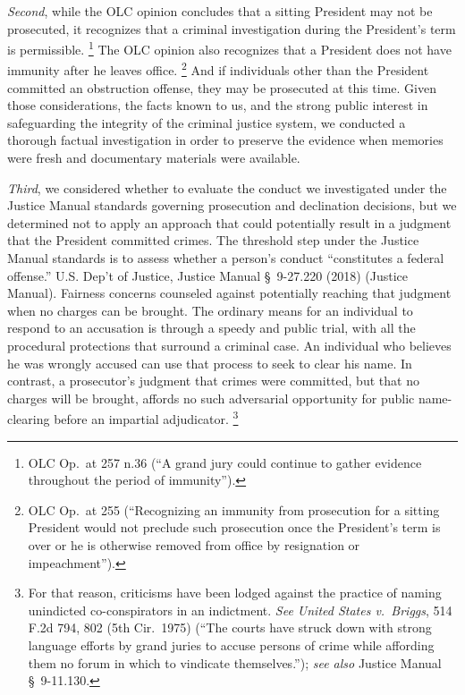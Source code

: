 \textit{Second}, while the OLC opinion concludes that a sitting President may not be prosecuted, it recognizes that a criminal investigation during the President’s term is permissible.%
\footnote{OLC Op.\ at 257 n.36 (“A grand jury could continue to gather evidence throughout the period of immunity”).}
The OLC opinion also recognizes that a President does not have immunity after he leaves office.%
\footnote{OLC Op.\ at 255 (“Recognizing an immunity from prosecution for a sitting President would not preclude such prosecution once the President’s term is over or he is otherwise removed from office by resignation or impeachment”).}
And if individuals other than the President committed an obstruction offense, they may be prosecuted at this time.
Given those considerations, the facts known to us, and the strong public interest in safeguarding the integrity of the criminal justice system, we conducted a thorough factual investigation in order to preserve the evidence when memories were fresh and documentary materials were available.

\textit{Third}, we considered whether to evaluate the conduct we investigated under the Justice Manual standards governing prosecution and declination decisions, but we determined not to apply an approach that could potentially result in a judgment that the President committed crimes.
The threshold step under the Justice Manual standards is to assess whether a person’s conduct
“constitutes a federal offense.”
U.S. Dep’t of Justice, Justice Manual \S~9-27.220 (2018) (Justice Manual).
Fairness concerns counseled against potentially reaching that judgment when no charges can be brought.
The ordinary means for an individual to respond to an accusation is through a speedy and public trial, with all the procedural protections that surround a criminal case.
An individual who believes he was wrongly accused can use that process to seek to clear his name.
In contrast, a prosecutor’s judgment that crimes were committed, but that no charges will be brought, affords no such adversarial opportunity for public name-clearing before an impartial adjudicator.%
\footnote{For that reason, criticisms have been lodged against the practice of naming unindicted co-conspirators in an indictment.
\textit{See United States v.\ Briggs}, 514 F.2d 794, 802 (5th Cir.~1975) (“The courts have struck down with strong language efforts by grand juries to accuse persons of crime while affording them no forum in which to vindicate themselves.”);
\textit{see also} Justice Manual \S~9-11.130.}

